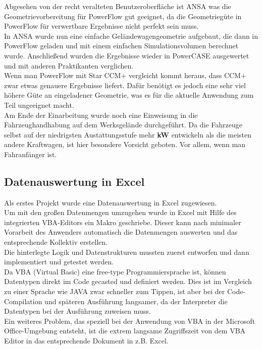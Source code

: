 Abgesehen von der recht veralteten Benutzeroberfläche ist ANSA was die Geometrievorbereitung für PowerFlow gut geeignet, da die Geometriegüte in PowerFlow für verwertbare Ergebnisse nicht perfekt sein muss. \\
In ANSA wurde nun eine einfache Geländewagengeometrie aufgebaut, die dann in PowerFlow geladen und mit einem einfachen Simulationsvolumen berechnet wurde. Anschließend wurden die Ergebnisse wieder in PowerCASE ausgewertet und mit anderen Praktikanten verglichen.\\

Wenn man PowerFlow mit Star CCM+ vergleicht kommt heraus, dass CCM+ zwar etwas genauere Ergebnisse liefert. Dafür benötigt es jedoch eine sehr viel höhere Güte an eingeladener Geometrie, was es für die aktuelle Anwendung zum Teil ungeeignet macht. \\

Am Ende der Einarbeitung wurde noch eine Einweisung in die Fahrzeughandhabung auf dem Werksgelände durchgeführt. Da die Fahrzeuge selbst auf der niedrigsten Austattungsstufe mehr \textbf{kW} entwickeln als die meisten andere Kraftwagen, ist hier besondere Vorsicht geboten. Vor allem, wenn man Fahranfänger ist. \\

\newpage
\subsection{Datenauswertung in Excel}
\label{Excel}

Als erstes Projekt wurde eine Datenauswertung in Excel zugewiesen. \\
Um mit den großen Datenmengen umzugehen wurde in Excel mit Hilfe des integrierten VBA-Editors ein Makro geschriebe. Dieser kann nach minimaler Vorarbeit des Anwenders automatisch die Datenmengen auswerten und das entsprechende Kollektiv erstellen. \\
Die hinterlegte Logik und Datenstrukturen mussten zuerst entworfen und dann implementiert und getestet werden. \\
Da VBA (Virtual Basic) eine free-type Programmiersprache ist, können Datentypen direkt im Code gecasted und definiert werden. Dies ist im Vergleich zu einer Sprache wie JAVA zwar schneller zum Tippen, ist aber bei der Code-Compilation und späteren Ausführung langsamer, da der Interpreter die Datentypen bei der Ausführung zuweisen muss. \\
Ein weiteres Problem, das speziell bei der Anwendung von VBA in der Microsoft Office-Umgebung entsteht, ist die extrem langsame Zugriffszeit von dem VBA Editor in das entsprechende Dokument in z.B. Excel.\\

